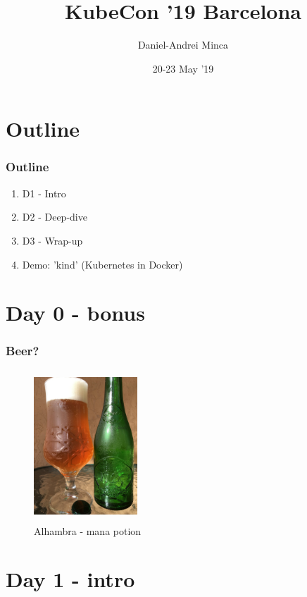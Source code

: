 \documentclass[default]{beamer}
\title{KubeCon '19 Barcelona}
\author{Daniel-Andrei Minca}
\institute{Site Reliability Engineer @ GfK SE}
\date{20-23 May '19}
\begin{document}
\begin{frame}
  \titlepage
\end{frame}

\section[Outline]{Outline}
\begin{frame}
  \frametitle{Outline}
  \begin{enumerate}
    \item D1 - Intro
    \item D2 - Deep-dive
    \item D3 - Wrap-up
    \item Demo: 'kind' (Kubernetes in Docker)\footnotemark
  \end{enumerate}
\end{frame}


\section{Day 0 - bonus}
\begin{frame}
  \frametitle{Beer?}
  \begin{figure}
    \includegraphics[width=110pt,height=160pt]{static/beer.jpg}
    \caption{Alhambra - mana potion}
  \end{figure}
\end{frame}

\section{Day 1 - intro}
\end{document}

